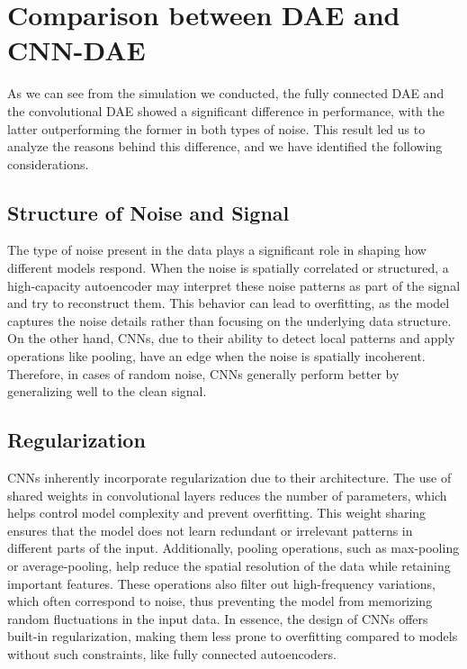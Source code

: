 \documentclass[10pt,conference,compsocconf]{IEEEtran}
\begin{document}
\section{Comparison between DAE and CNN-DAE}
As we can see from the simulation we conducted, the fully connected DAE and the convolutional DAE showed a significant difference in performance, with the latter outperforming the former 
in both types of noise. This result led us to analyze the reasons behind this difference, and we have identified the following considerations.

\subsection{Structure of Noise and Signal}
The type of noise present in the data plays a significant role in shaping how different models respond. When the noise is spatially correlated or structured, a high-capacity 
autoencoder may interpret these noise patterns as part of the signal and try to reconstruct them. This behavior can lead to overfitting, as the model captures 
the noise details rather than focusing on the underlying data structure. On the other hand, CNNs, due to their ability to detect local patterns and apply operations like pooling, have an edge when the noise is spatially incoherent. Therefore, in cases of random noise, CNNs generally perform better by generalizing well to the clean signal.

\subsection{Regularization}
CNNs inherently incorporate regularization due to their architecture. The use of shared weights in convolutional layers reduces the number of parameters, which helps control 
model complexity and prevent overfitting. This weight sharing ensures that the model does not learn redundant or irrelevant patterns in different parts of the input. 
Additionally, pooling operations, such as max-pooling or average-pooling, help reduce the spatial resolution of the data while retaining important features. 
These operations also filter out high-frequency variations, which often correspond to noise, thus preventing the model from memorizing random fluctuations in 
the input data. In essence, the design of CNNs offers built-in regularization, making them less prone to overfitting compared to models without such constraints, 
like fully connected autoencoders.
\end{document}

